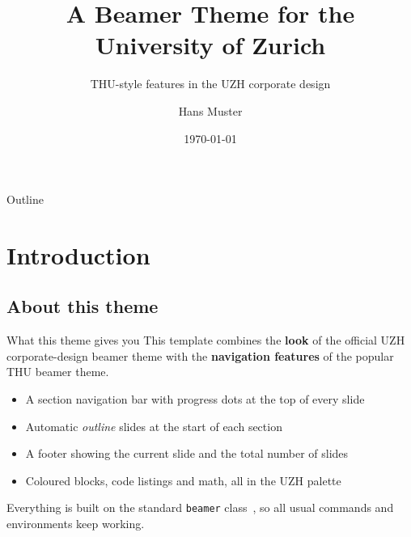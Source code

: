 \documentclass[aspectratio=169,onlytextwidth]{beamer}
\title{A Beamer Theme for the University of Zurich}
\subtitle{THU-style features in the UZH corporate design}
\author{Hans Muster}
\date{\today}
\institute{Department of XYZ}
\begin{document}
\maketitle

\begin{frame}{Outline}
  \setlength{\parskip}{\uzhtocparskip}
  \tableofcontents
\end{frame}


\section{Introduction}

\subsection{About this theme}

\begin{frame}{What this theme gives you}
  This template combines the \textbf{look} of the official UZH corporate-design
  beamer theme with the \textbf{navigation features} of the popular THU beamer
  theme.

  \begin{itemize}
    \item A section navigation bar with progress dots at the top of every slide
    \item Automatic \emph{outline} slides at the start of each section
    \item A footer showing the current slide and the total number of slides
    \item Coloured blocks, code listings and math, all in the UZH palette
  \end{itemize}

  Everything is built on the standard \texttt{beamer} class~\cite{lamport1994latex},
  so all usual commands and environments keep working.
\end{frame}

\begin{frame}{}

  \begin{steplist}
  \end{steplist}

\end{frame}
\end{document}
